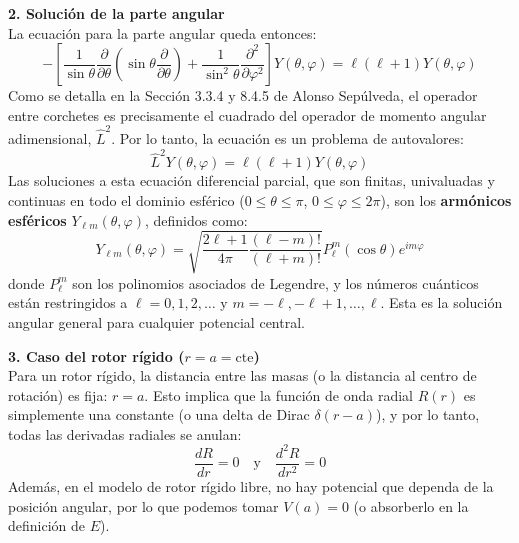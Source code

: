 \documentclass[a4paper]{article}
\begin{document}
\vspace{0.3cm}
\noindent\textbf{2. Solución de la parte angular} \\
La ecuación para la parte angular queda entonces:
$$
-\left[ \frac{1}{\sin\theta}\frac{\partial}{\partial \theta}\left(\sin\theta\frac{\partial}{\partial \theta}\right) + \frac{1}{\sin^2\theta}\frac{\partial^2}{\partial \varphi^2} \right] Y(\theta, \varphi) = \ell(\ell+1) Y(\theta, \varphi)
$$
Como se detalla en la Sección 3.3.4 y 8.4.5 de Alonso Sepúlveda, el operador entre corchetes es precisamente el cuadrado del operador de momento angular adimensional, $\hat{L}^2$. Por lo tanto, la ecuación es un problema de autovalores:
$$
\hat{L}^2 Y(\theta, \varphi) = \ell(\ell+1) Y(\theta, \varphi)
$$
Las soluciones a esta ecuación diferencial parcial, que son finitas, univaluadas y continuas en todo el dominio esférico ($0 \leq \theta \leq \pi$, $0 \leq \varphi \leq 2\pi$), son los \textbf{armónicos esféricos} $Y_{\ell m}(\theta, \varphi)$, definidos como:
$$
Y_{\ell m}(\theta, \varphi) = \sqrt{\frac{2\ell+1}{4\pi} \frac{(\ell-m)!}{(\ell+m)!}} P_\ell^m(\cos\theta) e^{im\varphi}
$$
donde $P_\ell^m$ son los polinomios asociados de Legendre, y los números cuánticos están restringidos a $\ell = 0, 1, 2, \dots$ y $m = -\ell, -\ell+1, \dots, \ell$. Esta es la solución angular general para cualquier potencial central.

\vspace{0.3cm}
\noindent\textbf{3. Caso del rotor rígido ($r = a = \text{cte}$)} \\
Para un rotor rígido, la distancia entre las masas (o la distancia al centro de rotación) es fija: $r = a$. Esto implica que la función de onda radial $R(r)$ es simplemente una constante (o una delta de Dirac $\delta(r-a)$), y por lo tanto, todas las derivadas radiales se anulan:
$$
\frac{dR}{dr} = 0 \quad \text{y} \quad \frac{d^2R}{dr^2} = 0
$$
Además, en el modelo de rotor rígido libre, no hay potencial que dependa de la posición angular, por lo que podemos tomar $V(a) = 0$ (o absorberlo en la definición de $E$). 
\end{document}
